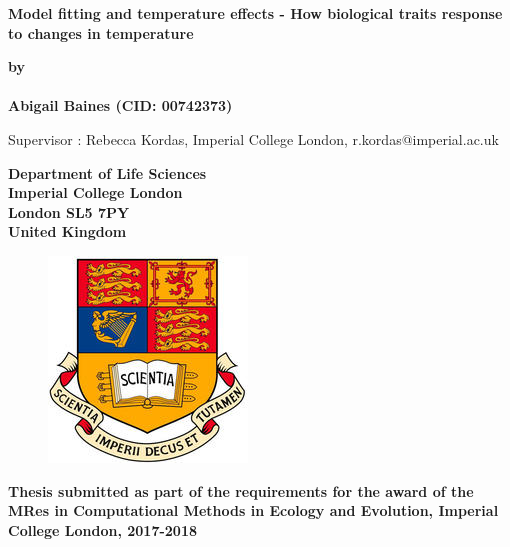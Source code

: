 \thispagestyle{empty}
\null\vskip0.2in%
\begin{center}
\LARGE{{\bf Model fitting and 
temperature effects - How 
biological traits response to changes
in temperature
}}
\end{center}

\vspace{0.5cm}

\begin{center}
{\Large {\bf by}}\\
\mbox{} \\
{\Large {\bf Abigail Baines (CID: 00742373)}}

{\Large Supervisor : Rebecca Kordas, Imperial College London, r.kordas@imperial.ac.uk}
\end{center}

\vspace{1cm}

\begin{center}
\large{\bf{Department of Life Sciences \\ Imperial College London \\
London SL5 7PY \\ United Kingdom}}
\end{center}


\vspace{1.5cm}

\begin{figure}[!h]
\centering
\includegraphics{crest.jpg}
\end{figure}

\vspace{1.5cm}

\begin{center}
\large{\bf{Thesis submitted as part of the requirements for the award of the \\
MRes in Computational Methods in Ecology and Evolution, Imperial College London, 2017-2018}}
\end{center}

\vspace{2cm}

